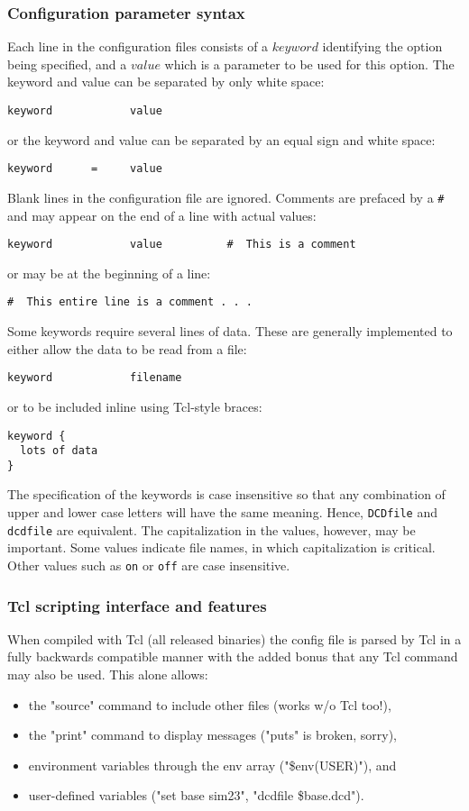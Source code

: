 \subsubsection{Configuration parameter syntax}
\label{section:configsyntax}
Each line
in the configuration files consists of a $keyword$ identifying the option
being specified, and a $value$ which is a parameter to be used for this
option.  The keyword and value can be separated by only white space:
\begin{verbatim}
keyword            value
\end{verbatim}
or the keyword and value can be separated by an equal sign and white space:
\begin{verbatim}
keyword      =     value
\end{verbatim}
Blank lines in the configuration file are ignored.  Comments are prefaced by
a \verb!#! and may appear on the end of a line with actual values:
\begin{verbatim}
keyword            value          #  This is a comment
\end{verbatim}
or may be at the beginning of a line:
\begin{verbatim}
#  This entire line is a comment . . . 
\end{verbatim}
Some keywords require several lines of data.
These are generally implemented to either allow the data to be read from a file:
\begin{verbatim}
keyword            filename
\end{verbatim}
or to be included inline using Tcl-style braces:
\begin{verbatim}
keyword {
  lots of data
}
\end{verbatim}

The specification of the keywords is case insensitive 
so that any combination of 
upper and lower case letters will have the same meaning.  
Hence, {\tt DCDfile} and {\tt dcdfile} 
are equivalent.  The capitalization in the values, however, may be important.
Some values indicate file names, in which capitalization is critical.  
Other values such as {\tt on} or {\tt off} are case insensitive.

\subsubsection{Tcl scripting interface and features}
\label{section:tclscripting}

When compiled with Tcl (all released binaries) the config file
is parsed by Tcl in a fully backwards compatible manner with the
added bonus that any Tcl command may also be used.  This alone allows:
\begin{itemize}
 \item the "source" command to include other files (works w/o Tcl too!),
 \item the "print" command to display messages ("puts" is broken, sorry),
 \item environment variables through the env array ("\$env(USER)"), and
 \item user-defined variables ("set base sim23", "dcdfile \${base}.dcd").
\end{itemize}

